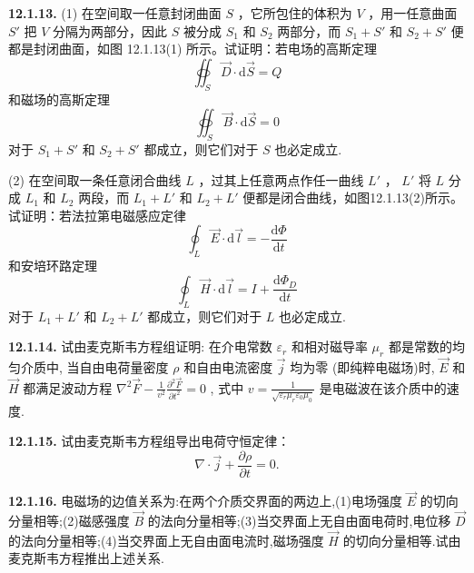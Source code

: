 \vfill
\newpage

\textbf{12.1.13.} (1) 在空间取一任意封闭曲面 $S$ ，它所包住的体积为 $V$ ，用一任意曲面 $S'$ 把 $V$ 分隔为两部分，因此 $S$ 被分成 $S_1$ 和 $S_2$ 两部分，而 $S_1 + S'$ 和 $S_2 + S'$ 便都是封闭曲面，如图 12.1.13(1) 所示。试证明：若电场的高斯定理
\[
\oiint_{S} \vec{D} \cdot \mathrm{d}\vec{S} = Q
\]
和磁场的高斯定理
\[
\oiint_{S} \vec{B} \cdot \mathrm{d}\vec{S} = 0
\]
对于 $S_{1} + S'$ 和 $S_{2} + S'$ 都成立，则它们对于 $S$ 也必定成立.

(2) 在空间取一条任意闭合曲线 $L$ ，过其上任意两点作任一曲线 $L'$ ， $L'$ 将 $L$ 分成 $L_1$ 和 $L_2$ 两段，而 $L_1 + L'$ 和 $L_2 + L'$ 便都是闭合曲线，如图12.1.13(2)所示。试证明：若法拉第电磁感应定律
\[
\oint_{L} \vec{E} \cdot \mathrm{d}\vec{l} = - \frac{\mathrm{d}\Phi}{\mathrm{d}t}
\]
和安培环路定理
\[
\oint_{L} \vec{H} \cdot \mathrm{d}\vec{l} = I + \frac{\mathrm{d}\Phi_{D}}{\mathrm{d}t}
\]
对于 $L_{1} + L'$ 和 $L_{2} + L'$ 都成立，则它们对于 $L$ 也必定成立.

\begin{center}
  \begin{minipage}[b]{0.47\linewidth}
    \centering
  \end{minipage}\hfill
  \begin{minipage}[b]{0.47\linewidth}
    \centering
  \end{minipage}
\end{center}

\vfill
\newpage

\textbf{12.1.14.} 试由麦克斯韦方程组证明: 在介电常数 $\varepsilon_r$ 和相对磁导率 $\mu_r$ 都是常数的均匀介质中, 当自由电荷量密度 $\rho$ 和自由电流密度 $\vec{j}$ 均为零 (即纯粹电磁场)时, $\vec{E}$ 和 $\vec{H}$ 都满足波动方程 $\displaystyle \nabla^2 \vec{F} - \frac{1}{v^2} \frac{\partial^2 \vec{F}}{\partial t^2} = 0$ , 式中 $\displaystyle v = \frac{1}{\sqrt{\varepsilon_r \mu_r \varepsilon_0 \mu_0}}$ 是电磁波在该介质中的速度.

\vfill
\newpage

\textbf{12.1.15.} 试由麦克斯韦方程组导出电荷守恒定律：
\[
\nabla \cdot \vec{j} + \frac{\partial \rho}{\partial t} = 0.
\]

\vfill
\newpage

\textbf{12.1.16.} 电磁场的边值关系为:在两个介质交界面的两边上,(1)电场强度 $\vec{E}$ 的切向分量相等;(2)磁感强度 $\vec{B}$ 的法向分量相等;(3)当交界面上无自由面电荷时,电位移 $\vec{D}$ 的法向分量相等;(4)当交界面上无自由面电流时,磁场强度 $\vec{H}$ 的切向分量相等.试由麦克斯韦方程推出上述关系.

